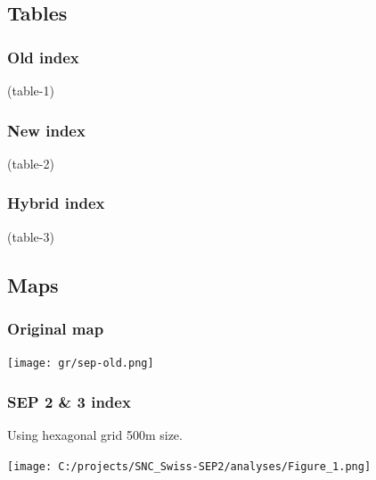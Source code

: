 \documentclass[a4paper, notitlepage, fleqn]{article} %
\begin{document}
\subsection{Tables}
\newpage
\subsubsection{Old index}
\begin{landscape}
\begin{footnotesize}
(table-1)
\end{footnotesize}
\end{landscape}

\newpage
\subsubsection{New index}
\begin{landscape}
\begin{footnotesize}
(table-2)
\end{footnotesize}
\end{landscape}

\newpage
\subsubsection{Hybrid index}
\begin{landscape}
\begin{footnotesize}
(table-3)
\end{footnotesize}
\end{landscape}

\newpage
\subsection{Maps}
\subsubsection{Original map}
\begin{center}
\texttt{[image: gr/sep-old.png]} 
\end{center}
\newpage 
\subsubsection{SEP 2 \& 3 index}

Using hexagonal grid 500m size.  
\begin{center}
\texttt{[image: C:/projects/SNC\_Swiss-SEP2/analyses/Figure\_1.png]} 
\end{center}
\newpage
\end{document}
